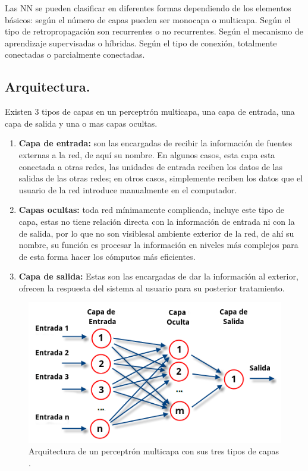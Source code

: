 \documentclass[12pt,letterpaper,oneside,openright]{book}
\begin{document}
 	Las NN se pueden clasificar en diferentes formas dependiendo de los elementos básicos: según el número de capas pueden ser monocapa o multicapa. Según el tipo de retropropagación son recurrentes o no recurrentes. Según el mecanismo de aprendizaje supervisadas o híbridas. Según el tipo de conexión, totalmente conectadas o parcialmente conectadas.
 	
 	\subsection{Arquitectura.}
 	Existen 3 tipos de capas en un perceptrón multicapa, una capa de entrada, una capa de salida y una o mas capas ocultas.
 	\begin{enumerate}
 		\item \textbf{Capa de entrada:} son las encargadas de recibir la información de fuentes externas a la red, de aquí su nombre. En algunos casos, esta capa esta conectada a otras redes, las unidades de entrada reciben los datos de las salidas de las otras redes; en otros casos, simplemente reciben los datos que el usuario de la red introduce manualmente en el computador.
 		\item \textbf{Capas ocultas:} toda red mínimamente complicada, incluye este tipo de capa, estas no tiene relación directa con la información de entrada ni con la de salida, por lo que no son \guillemetleft visibles\guillemetright al ambiente exterior de la red, de ahí su nombre, su función es procesar la información en niveles más complejos para de esta forma hacer los cómputos más eficientes.
 		\item \textbf{Capa de salida:} Estas son las encargadas de dar la información al exterior, ofrecen la respuesta del sistema al usuario para su posterior tratamiento.
 	\end{enumerate}
 	\begin{figure}[h]
 		\centering
 		\includegraphics[width=0.7\linewidth]{Sem_1/figuras/RedNeuronalArtificial.png}
 		\caption{Arquitectura de un perceptrón multicapa con sus tres tipos de capas \cite{percMulti}.}
 		\label{fig:perceptron_multicapa}
 	\end{figure}
 	
\end{document}
